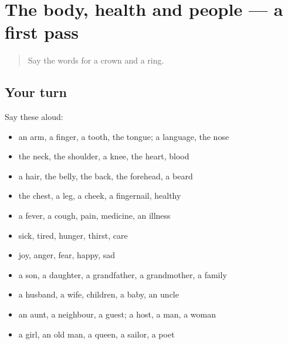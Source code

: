 \section[(dialogue)]{The body, health and people — a first pass}

\label{lesson:LA-R85-first-pass-the-body-health-and-people}



\begin{quote}
Say the words for a crown and a ring.
\end{quote}

\subsection*{Your turn}
Say these aloud:

\begin{itemize}
\raggedright
  \item an arm, a finger, a tooth, the tongue; a language, the nose
  \item the neck, the shoulder, a knee, the heart, blood
  \item a hair, the belly, the back, the forehead, a beard
  \item the chest, a leg, a cheek, a fingernail, healthy
  \item a fever, a cough, pain, medicine, an illness
  \item sick, tired, hunger, thirst, care
  \item joy, anger, fear, happy, sad
  \item a son, a daughter, a grandfather, a grandmother, a family
  \item a husband, a wife, children, a baby, an uncle
  \item an aunt, a neighbour, a guest; a host, a man, a woman
  \item a girl, an old man, a queen, a sailor, a poet
\end{itemize}

